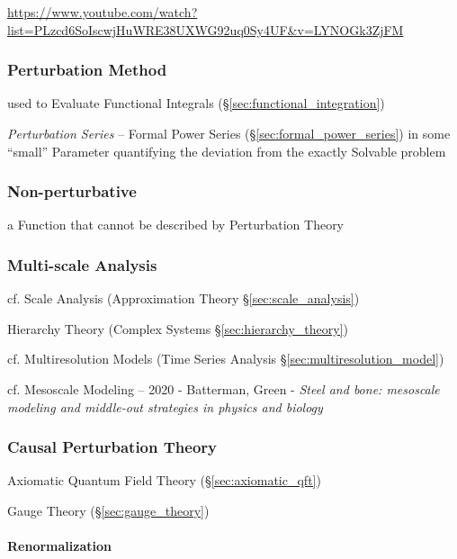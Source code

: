{\url{https://www.youtube.com/watch?list=PLzcd6SoIscwjHuWRE38UXWG92uq0Sy4UF&v=LYNOGk3ZjFM}



\subsubsection{Perturbation Method}\label{sec:perturbation_method}

used to Evaluate Functional Integrals (\S\ref{sec:functional_integration})

\emph{Perturbation Series} -- Formal Power Series
(\S\ref{sec:formal_power_series}) in some ``small'' Parameter quantifying the
deviation from the exactly Solvable problem



\subsubsection{Non-perturbative}\label{sec:non_perturbative}

a Function that cannot be described by Perturbation Theory



\subsubsection{Multi-scale Analysis}\label{sec:multiscale_analysis}

cf. Scale Analysis (Approximation Theory \S\ref{sec:scale_analysis})

\fist Hierarchy Theory (Complex Systems \S\ref{sec:hierarchy_theory})

cf. Multiresolution Models (Time Series Analysis
\S\ref{sec:multiresolution_model})

cf. Mesoscale Modeling -- 2020 - Batterman, Green - \emph{Steel and bone:
  mesoscale modeling and middle-out strategies in physics and biology}



\subsubsection{Causal Perturbation Theory}\label{sec:causal_perturbation}

Axiomatic Quantum Field Theory (\S\ref{sec:axiomatic_qft})

Gauge Theory (\S\ref{sec:gauge_theory})



\paragraph{Renormalization}\label{sec:renormalization}\hfill

}
